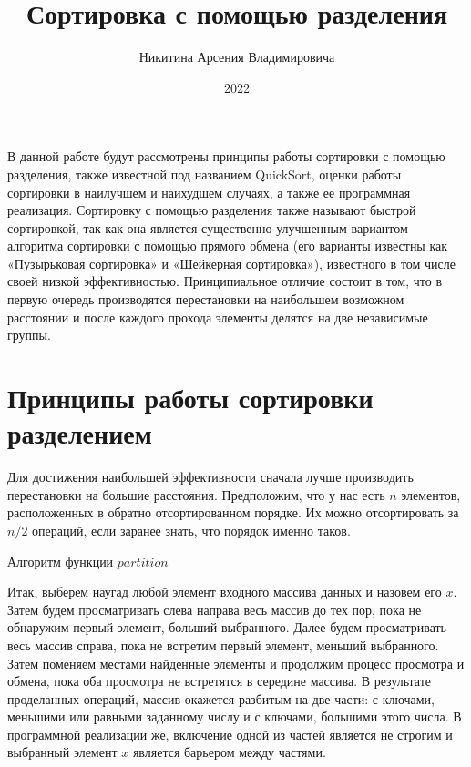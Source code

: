 \documentclass[bachelor, och, labwork]{shiza}
\begin{document}

\title{Сортировка с помощью разделения}





\author{Никитина Арсения Владимировича}



\date{2022}

\maketitle

\tableofcontents

\intro
В данной работе будут рассмотрены принципы работы сортировки с помощью 
разделения, также известной под названием QuickSort, оценки работы сортировки в 
наилучшем и наихудшем случаях, а также ее программная реализация.
Сортировку с помощью разделения также называют быстрой сортировкой, так как она
является существенно улучшенным вариантом алгоритма сортировки с помощью 
прямого обмена (его варианты известны как «Пузырьковая сортировка» и «Шейкерная 
сортировка»), известного в том числе своей низкой эффективностью. Принципиальное 
отличие состоит в том, что в первую очередь производятся перестановки на 
наибольшем возможном расстоянии и после каждого прохода элементы делятся на две 
независимые группы.

\section{Принципы работы сортировки разделением}

Для достижения наибольшей эффективности сначала лучше производить перестановки
на большие расстояния. Предположим, что у нас есть $n$ элементов, расположенных
в обратно отсортированном порядке. Их можно отсортировать за $n/2$ операций,
если заранее знать, что порядок именно таков.

\begin{center}Алгоритм функции $partition$\end{center}

Итак, выберем наугад любой элемент входного массива данных и назовем его $x$.
Затем будем просматривать слева направа весь массив до тех пор, пока не
обнаружим первый элемент, больший выбранного. Далее будем просматривать весь
массив справа, пока не встретим первый элемент, меньший выбранного.
Затем поменяем местами найденные элементы и продолжим процесс просмотра и обмена,
пока оба просмотра не встретятся в середине массива. В результате 
проделанных операций, массив окажется разбитым на две части: с ключами, меньшими
или равными заданному числу и с ключами, большими этого числа.
В программной реализации же, включение одной из частей является не строгим и 
выбранный элемент $x$ является барьером между частями.
\end{document}
